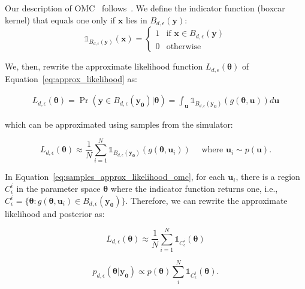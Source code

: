 \documentclass[article]{jss}
\newcommand{\ub}{\mathbf{u}}
\newcommand{\yb}{\mathbf{y}}
\newcommand{\xb}{\mathbf{x}}
\newcommand{\thetab}{\boldsymbol{\theta}}
\newcommand{\simulator}{g}
\newcommand{\region}{B_{d,\epsilon}}
\newcommand{\indicator}[1]{\mathbb{1}_{#1}}
\newcommand{\data}{\mathbf{y_0}}
\newcommand{\accregioni}{C^i_{\epsilon}}
\begin{document}
Our description of OMC~\citet{Meeds2015}
follows~\citet{Ikonomov2019}. We define the indicator function (boxcar
kernel) that equals one only if \(\xb\) lies in \(\region(\yb)\):
%
\begin{equation}
  \label{eq:indicator}
  \indicator{\region(\yb)}(\xb)=
  \left\{
    \begin{array}{ll}
      1 & \mbox{if } \xb \in \region(\yb) \\
      0 & \mbox{otherwise}
    \end{array} \right. \end{equation}
%

We, then, rewrite the approximate likelihood function
\(L_{d, \epsilon}(\thetab)\) of Equation~\ref{eq:approx_likelihood} as:

\begin{gather}
  \label{eq:approx_likelihood_omc}
  L_{d, \epsilon}(\thetab) = \Pr(\yb \in \region(\data) | \thetab) =
  \int_{\ub} \indicator{\region(\data)}(g(\thetab, \ub)) d \ub
\end{gather}

which can be approximated using samples from the simulator:

\begin{equation}
  \label{eq:samples_approx_likelihood_omc}
  L_{d, \epsilon}(\thetab) \approx \frac{1}{N} \sum_{i=1}^N \indicator{\region (\data)} (\simulator(\thetab, \ub_i))
 \quad \text{ where } \ub_i \sim p(\ub).
\end{equation}

In Equation~\ref{eq:samples_approx_likelihood_omc}, for each
\(\ub_i\), there is a region \(\accregioni\) in the parameter space
\(\thetab\) where the indicator function returns one, i.e.,
\(\accregioni = \{ \thetab: \simulator(\thetab, \ub_i) \in
\region(\data) \}\). Therefore, we can rewrite the approximate
likelihood and posterior as:

\begin{equation}
  \label{eq:alt_view_theta}
  L_{d, \epsilon}(\thetab) \approx \frac{1}{N} \sum_{i=1}^N \indicator{\accregioni}(\thetab)
\end{equation}

\begin{equation}
  \label{eq:approx_posterior_omc}
  p_{d,\epsilon}(\thetab|\data) \propto
  p(\thetab) \sum_i^N  \indicator{\accregioni}(\thetab).
\end{equation}
\end{document}
